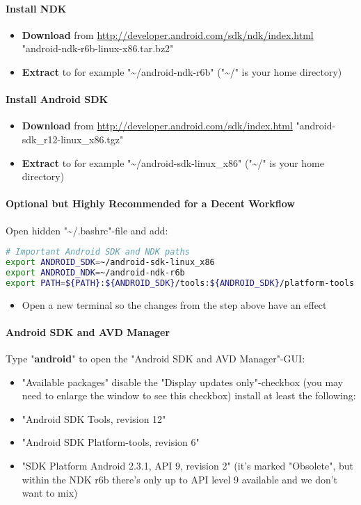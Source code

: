 \paragraph{Install \ac{NDK}}
\begin{itemize}
\item{\textbf{Download} from \url{http://developer.android.com/sdk/ndk/index.html} \textrightarrow{} "android-ndk-r6b-linux-x86.tar.bz2"}
\item{\textbf{Extract} to for example "\textasciitilde /android-ndk-r6b" ("\textasciitilde /" is your home directory)}
\end{itemize}


\paragraph{Install Android \ac{SDK}}
\begin{itemize}
\item{\textbf{Download} from \url{http://developer.android.com/sdk/index.html} \textrightarrow{} "android-sdk\_r12-linux\_x86.tgz"}
\item{\textbf{Extract} to for example "\textasciitilde /android-sdk-linux\_x86" ("\textasciitilde /" is your home directory)}
\end{itemize}


\paragraph{Optional but Highly Recommended for a Decent Workflow}
Open hidden "\textasciitilde /.bashrc"-file and add:
\begin{lstlisting}[language=sh]
# Important Android SDK and NDK paths
export ANDROID_SDK=~/android-sdk-linux_x86
export ANDROID_NDK=~/android-ndk-r6b
export PATH=${PATH}:${ANDROID_SDK}/tools:${ANDROID_SDK}/platform-tools:~/${ANDROID_NDK}
\end{lstlisting}
\begin{itemize}
\item{Open a new terminal so the changes from the step above have an effect}
\end{itemize}


\paragraph{Android \ac{SDK} and AVD Manager}
Type "\textbf{android}" to open the "Android SDK and AVD Manager"-\ac{GUI}:
\begin{itemize}
\item{"Available packages" \textrightarrow{} disable the "Display updates only"-checkbox (you may need to enlarge the window to see this checkbox) \textrightarrow{} install at least the following:}
\item{"Android SDK Tools, revision 12"}
\item{"Android SDK Platform-tools, revision 6"}
\item{"SDK Platform Android 2.3.1, \ac{API} 9, revision 2" (it's marked "Obsolete", but within the \ac{NDK} r6b there's only up to \ac{API} level 9 available and we don't want to mix)}
\end{itemize}




